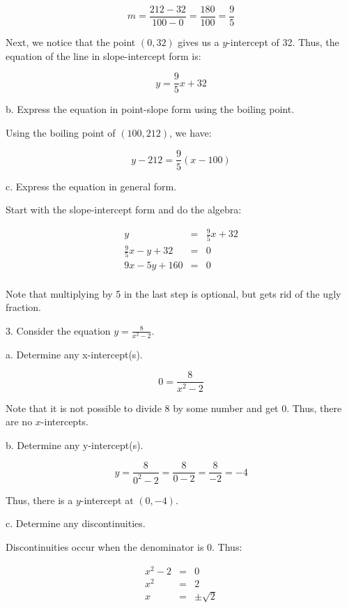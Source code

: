 \documentclass[letterpaper, 12pt]{article}
\begin{document}
\[m=\frac{212-32}{100-0}=\frac{180}{100}=\frac{9}{5}\]

Next, we notice that the point $(0,32)$ gives us a $y$-intercept of 32. Thus,
the equation of the line in slope-intercept form is:

\[y=\frac{9}{5}x+32\]

b. Express the equation in point-slope form using the boiling point.

\bigskip

Using the boiling point of $(100,212)$, we have:

\[y-212=\frac{9}{5}(x-100)\]

c. Express the equation in general form.

Start with the slope-intercept form and do the algebra:

\begin{eqnarray*}
y &=& \frac{9}{5}x+32 \\
\frac{9}{5}x-y+32 &=& 0 \\
9x-5y+160 &=& 0 \\
\end{eqnarray*}

Note that multiplying by 5 in the last step is optional, but gets rid of the
ugly fraction.

\newpage

3. Consider the equation $y=\frac{8}{x^2-2}$.

\bigskip

a. Determine any x-intercept(s).

\[0=\frac{8}{x^2-2}\]

Note that it is not possible to divide 8 by some number and get 0. Thus, there
are no $x$-intercepts.

\bigskip

b. Determine any y-intercept(s).

\[y=\frac{8}{0^2-2}=\frac{8}{0-2}=\frac{8}{-2}=-4\]

Thus, there is a $y$-intercept at $(0,-4)$.

\bigskip

c. Determine any discontinuities.

\bigskip

Discontinuities occur when the denominator is 0. Thus:

\begin{eqnarray*}
x^2-2 &=& 0 \\
x^2 &=& 2 \\
x &=& \pm\sqrt{2} \\
\end{eqnarray*}
\end{document}

